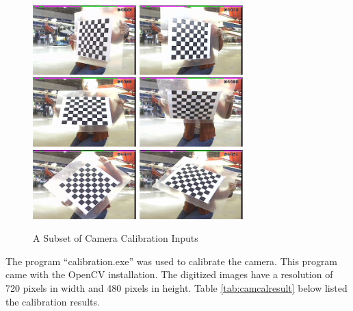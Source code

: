 \begin{figure}[h]
  \centering
  \includegraphics[width=4cm,keepaspectratio=true]{./Figures/camcal/camcal1_130.jpeg}
  \includegraphics[width=4cm,keepaspectratio=true]{./Figures/camcal/camcal1_140.jpeg}
  \includegraphics[width=4cm,keepaspectratio=true]{./Figures/camcal/camcal1_160.jpeg}
  \includegraphics[width=4cm,keepaspectratio=true]{./Figures/camcal/camcal1_180.jpeg}
  \includegraphics[width=4cm,keepaspectratio=true]{./Figures/camcal/camcal1_210.jpeg}
  \includegraphics[width=4cm,keepaspectratio=true]{./Figures/camcal/camcal1_240.jpeg}
  \caption{A Subset of Camera Calibration Inputs}
  \label{fig:camcal}
\end{figure}

The program ``calibration.exe'' was used to calibrate the camera. This program came with the OpenCV installation. The digitized images have a resolution of 720 pixels in width and 480 pixels in height. Table \ref{tab:camcalresult} below listed the calibration results.

